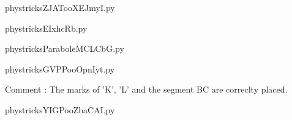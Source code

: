     

    \clearpage
    


    \newcommand{\CaptionFigZJATooXEJmyI}{<+Type your caption here+>}
    \begin{center}
        
    \end{center}
    phystricksZJATooXEJmyI.py

    

    \clearpage
    


    \newcommand{\CaptionFigEIxhcRb}{<+Type your caption here+>}
    \begin{center}
        
    \end{center}
    phystricksEIxhcRb.py

    

    \clearpage
    


    \newcommand{\CaptionFigParaboleMCLCbG}{<+Type your caption here+>}
    \begin{center}
        
    \end{center}
    phystricksParaboleMCLCbG.py

    

    \clearpage
    


    \newcommand{\CaptionFigGVPPooOpnIyt}{<+Type your caption here+>}
    \begin{center}
        
    \end{center}
    phystricksGVPPooOpnIyt.py

    Comment : The marks of 'K', 'L' and the segment BC are correclty placed.

    \clearpage
    


    \newcommand{\CaptionFigYIGPooZbaCAI}{<+Type your caption here+>}
    \begin{center}
        
    \end{center}
    phystricksYIGPooZbaCAI.py

    

    \clearpage
    

